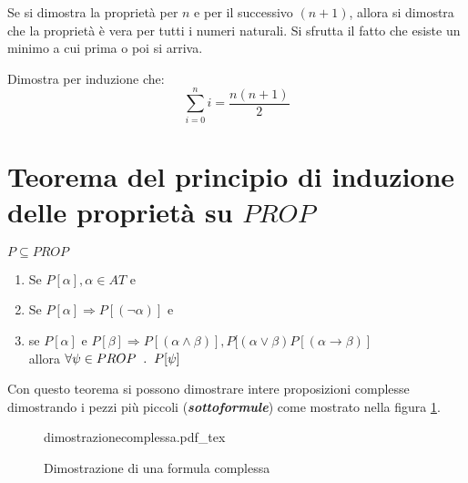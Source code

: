 \documentclass{article}
\newcommand{\incfig}[2][1]{%
	\def\svgwidth{#1\columnwidth}
	{#2.pdf_tex}
}
\theoremstyle{break}
\theoremstyle{break}
\theoremstyle{break}
\theoremstyle{break}
\begin{document}
Se si dimostra la proprietà per \( n \) e per il successivo \( (n+1) \), allora
si dimostra che la proprietà è vera per tutti i numeri naturali. Si sfrutta
il fatto che esiste un minimo a cui prima o poi si arriva.
\begin{exercise}
	Dimostra per induzione che:
	\[\sum_{i=0}^{n} i = \frac{n(n+1)}{2}\]

\end{exercise}
\section{Teorema del principio di induzione delle proprietà su \( PROP \)}
\begin{definition}
	\( P \subseteq PROP \)
	\begin{enumerate}
		\item Se \( P[\alpha ], \alpha \in AT \) e
		\item Se \( P[\alpha ] \Rightarrow P[(\neg \alpha )] \) e
		\item se \( P[\alpha ]\) e \(P[\beta ] \Rightarrow P[(\alpha \wedge \beta )],
		      P[(\alpha \vee \beta) P[(\alpha \to \beta )]\)\\
		      allora \( \forall \psi \in PROP \hspace{2mm} . \hspace{2mm} P[\psi]\)
	\end{enumerate}
\end{definition}

Con questo teorema si possono dimostrare intere proposizioni complesse dimostrando i pezzi
più piccoli (\textbf{\emph{sottoformule}}) come mostrato nella figura \ref{fig:dimostrazionecomplessa}.

\label{ex:dimostrazioneComplessa}
\begin{figure}[ht]
	\centering
	\incfig[1]{dimostrazionecomplessa}
	\caption{Dimostrazione di una formula complessa}
	\label{fig:dimostrazionecomplessa}
\end{figure}

\pagebreak
\end{document}

